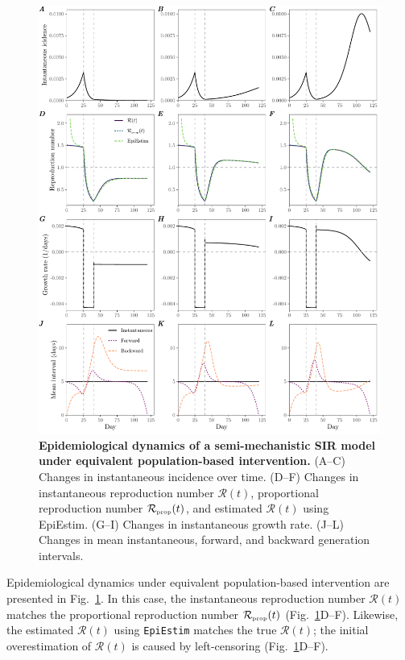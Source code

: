 \documentclass[12pt]{article}
\newcommand{\fref}[1]{Fig.~\ref{fig:#1}}
\newcommand{\RR}{\ensuremath{{\mathcal R}}\xspace}
\newcommand{\tsub}[2]{#1_{{\textrm{\tiny #2}}}}
\begin{document}
\begin{figure}
\includegraphics[width=\textwidth]{figure_sir_beta.pdf}
\caption{
\textbf{Epidemiological dynamics of a semi-mechanistic SIR model under equivalent population-based intervention.}
(A--C) Changes in instantaneous incidence over time.
(D--F) Changes in instantaneous reproduction number $\RR(t)$, proportional reproduction number $\tsub{\RR}{prop}(t)$, and estimated $\RR(t)$ using EpiEstim.
(G--I) Changes in instantaneous growth rate.
(J--L) Changes in mean instantaneous, forward, and backward generation intervals.
}
\label{fig:sir_beta}
\end{figure}

Epidemiological dynamics under equivalent population-based intervention are presented in \fref{sir_beta}.
In this case, the instantaneous reproduction number $\RR(t)$ matches the proportional reproduction number $\tsub{\RR}{prop}(t)$ (\fref{sir_beta}D--F).
Likewise, the estimated $\RR(t)$ using \texttt{EpiEstim} matches the true $\RR(t)$;
the initial overestimation of $\RR(t)$ is caused by left-censoring (\fref{sir_beta}D--F).
\end{document}
